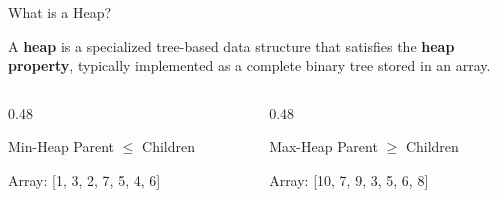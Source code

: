 \documentclass[aspectratio=169,xcolor=dvipsnames]{beamer}
\begin{document}
\begin{frame}{What is a Heap?}
  \begin{definition}
    A \textbf{heap} is a specialized tree-based data structure that satisfies the \textbf{heap property}, typically implemented as a complete binary tree stored in an array.
  \end{definition}

  \vspace{0.3cm}

  \begin{columns}
    \begin{column}{0.48\textwidth}
      \begin{block}{Min-Heap}
        Parent $\leq$ Children

        \vspace{0.2cm}


        Array: [1, 3, 2, 7, 5, 4, 6]
      \end{block}
    \end{column}
    \begin{column}{0.48\textwidth}
      \begin{block}{Max-Heap}
        Parent $\geq$ Children

        \vspace{0.2cm}


        Array: [10, 7, 9, 3, 5, 6, 8]
      \end{block}
    \end{column}
  \end{columns}
\end{frame}
\end{document}
